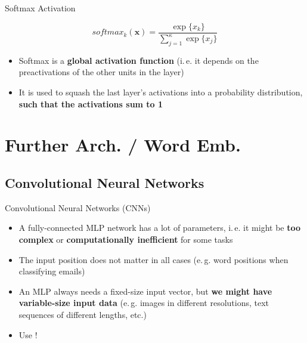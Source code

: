 \begin{frame}{Softmax Activation}{}
	\begin{boxBlueNoFrame}
		\begin{equation*}
			softmax_k(\bm{x}) = \frac{\exp\{ x_k\}}{\sum_{j=1}^{\kappa} \exp\{x_j\}}
		\end{equation*}
	\end{boxBlueNoFrame}
	\begin{itemize}
		\item Softmax is a \textbf{global activation function} (i.\,e. it depends on the preactivations of the other units in the layer)
		\item It is used to squash the last layer's activations into a probability distribution, \textbf{such that the activations sum to 1}
	\end{itemize}
\end{frame}


\section[Further Network Architectures and Word Embeddings]{Further Arch. / Word Emb.}

\subsection{Convolutional Neural Networks}

\begin{frame}{Convolutional Neural Networks (CNNs)}{}
	\begin{itemize}
		\item A fully-connected MLP network has a lot of parameters, i.\,e. it might be \textbf{too complex} or \textbf{computationally inefficient} for some tasks
		\item The input position does not matter in all cases (e.\,g. word positions when classifying emails)
		\item An MLP always needs a fixed-size input vector, but \textbf{we might have variable-size input data}
			(e.\,g. images in different resolutions, text sequences of different lengths, etc.)
		\item {} Use !
	\end{itemize}
\end{frame}


